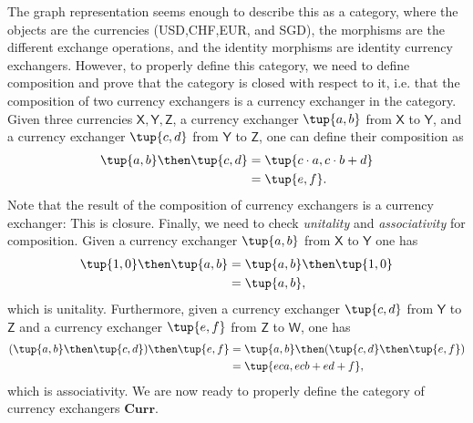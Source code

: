 The graph representation seems enough to describe this as a category, where the objects are the currencies (USD,CHF,EUR, and SGD), the morphisms are the different exchange operations, and the identity morphisms are identity currency exchangers. However, to properly define this category, we need to define composition and prove that the category is closed with respect to it, i.e. that the composition of two currency exchangers is a currency exchanger in the category. Given three currencies $\mathsf{X,Y,Z}$, a currency exchanger $\tup{a,b}$ from $\mathsf{X}$ to $\mathsf{Y}$, and a currency exchanger $\tup{c,d}$ from $\mathsf{Y}$ to $\mathsf{Z}$, one can define their composition as
\begin{equation}
\begin{aligned}
\label{eq:currencycomp}
    \tup{a,b}\then \tup{c,d}&=\tup{c\cdot a,c\cdot b+d}\\
    &=\tup{e,f}.
\end{aligned}
\end{equation}
Note that the result of the composition of currency exchangers is a currency exchanger: This is closure. Finally, we need to check \emph{unitality} and \emph{associativity} for composition. Given a currency exchanger $\tup{a,b}$ from $\mathsf{X}$ to $\mathsf{Y}$ one has
\begin{equation}
    \begin{aligned}
    \tup{1,0}\then \tup{a,b}&=\tup{a,b}\then \tup{1,0}\\
    &=\tup{a,b},
    \end{aligned}
\end{equation}
which is unitality. Furthermore, given a currency exchanger $\tup{c,d}$ from $\mathsf{Y}$ to $\mathsf{Z}$ and a currency exchanger $\tup{e,f}$ from $\mathsf{Z}$ to $\mathsf{W}$, one has
\begin{equation}
    \begin{aligned}
    (\tup{a,b}\then \tup{c,d})\then \tup{e,f}&=\tup{a,b}\then( \tup{c,d}\then \tup{e,f})\\
    &=\tup{eca, ecb+ed+f},
    \end{aligned}
\end{equation}
which is associativity.
We are now ready to properly define the category of currency exchangers $\mathbf{Curr}$.

